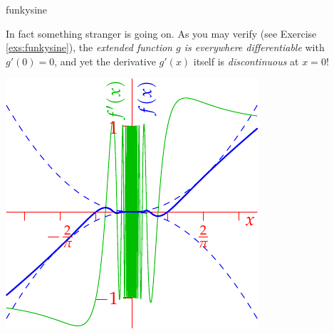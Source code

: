 \begin{examples}{}{funkysine}
\begin{enumerate}
\begin{minipage}[t]{0.6\linewidth}
			In fact something stranger is going on. As you may verify (see Exercise \ref{exs:funkysine}), the \emph{extended function $g$ is everywhere differentiable} with $g'(0)=0$, and yet the derivative $g'(x)$ itself is \emph{discontinuous} at $x=0$!
		\end{minipage}
		\hfill
		\begin{minipage}[t]{0.39\linewidth}\vspace{-5pt}
			\flushright\includegraphics[scale=0.98]{unifcontex1}
		\end{minipage}
	\end{enumerate}
\end{examples}

\clearpage


\goodbreak


